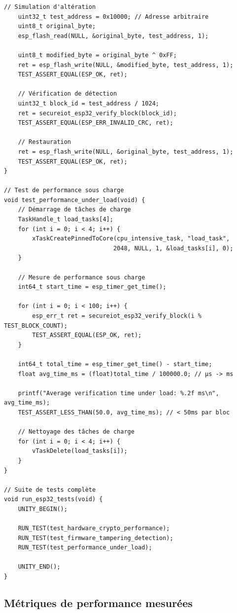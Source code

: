 \begin{lstlisting}[caption={Framework de test embarqué pour ESP32}]
    // Simulation d'altération
    uint32_t test_address = 0x10000; // Adresse arbitraire
    uint8_t original_byte;
    esp_flash_read(NULL, &original_byte, test_address, 1);
    
    uint8_t modified_byte = original_byte ^ 0xFF;
    ret = esp_flash_write(NULL, &modified_byte, test_address, 1);
    TEST_ASSERT_EQUAL(ESP_OK, ret);
    
    // Vérification de détection
    uint32_t block_id = test_address / 1024;
    ret = secureiot_esp32_verify_block(block_id);
    TEST_ASSERT_EQUAL(ESP_ERR_INVALID_CRC, ret);
    
    // Restauration
    ret = esp_flash_write(NULL, &original_byte, test_address, 1);
    TEST_ASSERT_EQUAL(ESP_OK, ret);
}

// Test de performance sous charge
void test_performance_under_load(void) {
    // Démarrage de tâches de charge
    TaskHandle_t load_tasks[4];
    for (int i = 0; i < 4; i++) {
        xTaskCreatePinnedToCore(cpu_intensive_task, "load_task", 
                               2048, NULL, 1, &load_tasks[i], 0);
    }
    
    // Mesure de performance sous charge
    int64_t start_time = esp_timer_get_time();
    
    for (int i = 0; i < 100; i++) {
        esp_err_t ret = secureiot_esp32_verify_block(i % TEST_BLOCK_COUNT);
        TEST_ASSERT_EQUAL(ESP_OK, ret);
    }
    
    int64_t total_time = esp_timer_get_time() - start_time;
    float avg_time_ms = (float)total_time / 100000.0; // µs -> ms
    
    printf("Average verification time under load: %.2f ms\n", avg_time_ms);
    TEST_ASSERT_LESS_THAN(50.0, avg_time_ms); // < 50ms par bloc
    
    // Nettoyage des tâches de charge
    for (int i = 0; i < 4; i++) {
        vTaskDelete(load_tasks[i]);
    }
}

// Suite de tests complète
void run_esp32_tests(void) {
    UNITY_BEGIN();
    
    RUN_TEST(test_hardware_crypto_performance);
    RUN_TEST(test_firmware_tampering_detection);
    RUN_TEST(test_performance_under_load);
    
    UNITY_END();
}
\end{lstlisting}

\subsection{Métriques de performance mesurées}

